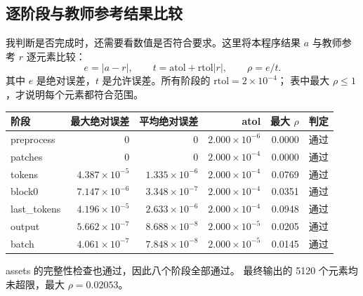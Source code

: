 \documentclass[a4paper,12pt]{article}
\begin{document}
\subsection{逐阶段与教师参考结果比较}
我判断是否完成时，还需要看数值是否符合要求。这里将本程序结果 $a$ 与教师参考 $r$ 逐元素比较：
\[
 e=|a-r|,\qquad t=\mathrm{atol}+\mathrm{rtol}|r|,\qquad \rho=e/t.
\]
其中 $e$ 是绝对误差，$t$ 是允许误差。所有阶段的 $\mathrm{rtol}=2\times10^{-4}$；
表中最大 $\rho\leq1$，才说明每个元素都符合范围。
\begin{center}
\small
\setlength{\tabcolsep}{4pt}
\begin{tabular}{@{}lrrrrc@{}}
\toprule
阶段 & 最大绝对误差 & 平均绝对误差 & atol & 最大 $\rho$ & 判定\\
\midrule
preprocess & 0 & 0 & $2.000\times10^{-6}$ & 0.0000 & 通过\\
patches & 0 & 0 & $2.000\times10^{-4}$ & 0.0000 & 通过\\
tokens & $4.387\times10^{-5}$ & $1.335\times10^{-6}$ & $2.000\times10^{-4}$ & 0.0769 & 通过\\
block0 & $7.147\times10^{-6}$ & $3.348\times10^{-7}$ & $2.000\times10^{-4}$ & 0.0351 & 通过\\
last\_tokens & $4.196\times10^{-5}$ & $2.633\times10^{-6}$ & $2.000\times10^{-4}$ & 0.0948 & 通过\\
output & $5.662\times10^{-7}$ & $8.688\times10^{-8}$ & $2.000\times10^{-5}$ & 0.0205 & 通过\\
batch & $4.061\times10^{-7}$ & $7.848\times10^{-8}$ & $2.000\times10^{-5}$ & 0.0145 & 通过\\
\bottomrule
\end{tabular}
\end{center}
assets 的完整性检查也通过，因此八个阶段全部通过。
最终输出的 5120 个元素均未超限，最大 $\rho=0.02053$。
\end{document}
